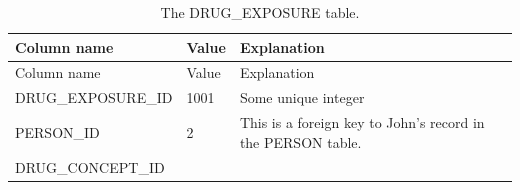\documentclass[10.5pt]{book}
\theoremstyle{definition}
\theoremstyle{definition}
\theoremstyle{definition}
\theoremstyle{remark}
\begin{document}
\begin{longtable}[]{@{}lll@{}}
\caption{\label{tab:johnDrug} The DRUG\_EXPOSURE table.}\tabularnewline
\toprule
\begin{minipage}[b]{0.28\columnwidth}\raggedright\strut
Column name\strut
\end{minipage} & \begin{minipage}[b]{0.16\columnwidth}\raggedright\strut
Value\strut
\end{minipage} & \begin{minipage}[b]{0.48\columnwidth}\raggedright\strut
Explanation\strut
\end{minipage}\tabularnewline
\midrule
\endfirsthead
\toprule
\begin{minipage}[b]{0.28\columnwidth}\raggedright\strut
Column name\strut
\end{minipage} & \begin{minipage}[b]{0.16\columnwidth}\raggedright\strut
Value\strut
\end{minipage} & \begin{minipage}[b]{0.48\columnwidth}\raggedright\strut
Explanation\strut
\end{minipage}\tabularnewline
\midrule
\endhead
\begin{minipage}[t]{0.28\columnwidth}\raggedright\strut
DRUG\_EXPOSURE\_ID\strut
\end{minipage} & \begin{minipage}[t]{0.16\columnwidth}\raggedright\strut
1001\strut
\end{minipage} & \begin{minipage}[t]{0.48\columnwidth}\raggedright\strut
Some unique integer\strut
\end{minipage}\tabularnewline
\begin{minipage}[t]{0.28\columnwidth}\raggedright\strut
PERSON\_ID\strut
\end{minipage} & \begin{minipage}[t]{0.16\columnwidth}\raggedright\strut
2\strut
\end{minipage} & \begin{minipage}[t]{0.48\columnwidth}\raggedright\strut
This is a foreign key to John's record in the PERSON table.\strut
\end{minipage}\tabularnewline
\begin{minipage}[t]{0.28\columnwidth}\raggedright\strut
DRUG\_CONCEPT\_ID\strut
\end{minipage} & \begin{minipage}[t]{0.16\columnwidth}\raggedright\strut

\end{minipage}
\end{longtable}
\end{document}
